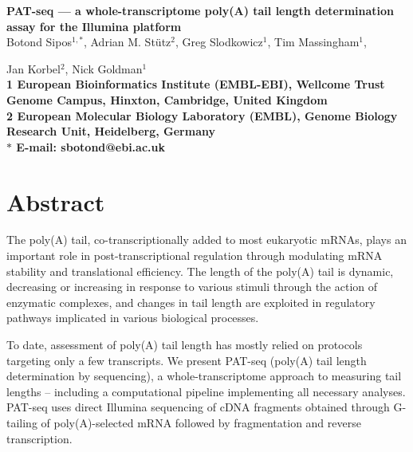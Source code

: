 \documentclass[10pt]{article}
\date{}
\begin{document}
\begin{flushleft}
{\Large
\textbf{PAT-seq --- a whole-transcriptome poly(A) tail length determination assay for the Illumina platform}
}
\\
Botond Sipos$^{1, \ast}$, 
Adrian M. St\"utz$^{2}$, 
Greg Slodkowicz$^{1}$,
Tim Massingham$^{1}$,

Jan Korbel$^{2}$, 
Nick Goldman$^{1}$
\\
\bf{1} European Bioinformatics Institute (EMBL-EBI), Wellcome Trust Genome Campus, Hinxton, Cambridge, United Kingdom
\\
\bf{2} European Molecular Biology Laboratory (EMBL), Genome Biology Research Unit, Heidelberg, Germany 
\\
$\ast$ E-mail: sbotond@ebi.ac.uk
\end{flushleft}


\section*{Abstract}

The poly(A) tail, co-transcriptionally added to most eukaryotic mRNAs, plays an important role in post-transcriptional regulation through modulating mRNA stability and translational efficiency. The length of the poly(A) tail is dynamic, decreasing or increasing in response to various stimuli through the action of enzymatic complexes, and changes in tail length are exploited in regulatory pathways implicated in various biological processes.

To date, assessment of poly(A) tail length has mostly relied on protocols targeting only a few transcripts. We present PAT-seq (poly(A) tail length determination by sequencing), a whole-transcriptome approach to measuring tail lengths  -- including a computational pipeline implementing all necessary analyses. PAT-seq uses direct Illumina sequencing of cDNA fragments obtained through G-tailing of poly(A)-selected mRNA followed by fragmentation and reverse transcription. 
\end{document}

